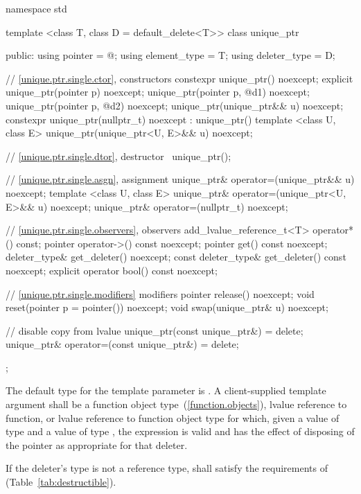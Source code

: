 %
\begin{codeblock}
namespace std {
  template <class T, class D = default_delete<T>> class unique_ptr {
  public:
    using pointer      = @\seebelow@;
    using element_type = T;
    using deleter_type = D;

    // \ref{unique.ptr.single.ctor}, constructors
    constexpr unique_ptr() noexcept;
    explicit unique_ptr(pointer p) noexcept;
    unique_ptr(pointer p, @\seebelow@ d1) noexcept;
    unique_ptr(pointer p, @\seebelow@ d2) noexcept;
    unique_ptr(unique_ptr&& u) noexcept;
    constexpr unique_ptr(nullptr_t) noexcept
      : unique_ptr() { }
    template <class U, class E>
      unique_ptr(unique_ptr<U, E>&& u) noexcept;

    // \ref{unique.ptr.single.dtor}, destructor
    ~unique_ptr();

    // \ref{unique.ptr.single.asgn}, assignment
    unique_ptr& operator=(unique_ptr&& u) noexcept;
    template <class U, class E> unique_ptr& operator=(unique_ptr<U, E>&& u) noexcept;
    unique_ptr& operator=(nullptr_t) noexcept;

    // \ref{unique.ptr.single.observers}, observers
    add_lvalue_reference_t<T> operator*() const;
    pointer operator->() const noexcept;
    pointer get() const noexcept;
    deleter_type& get_deleter() noexcept;
    const deleter_type& get_deleter() const noexcept;
    explicit operator bool() const noexcept;

    // \ref{unique.ptr.single.modifiers} modifiers
    pointer release() noexcept;
    void reset(pointer p = pointer()) noexcept;
    void swap(unique_ptr& u) noexcept;

    // disable copy from lvalue
    unique_ptr(const unique_ptr&) = delete;
    unique_ptr& operator=(const unique_ptr&) = delete;
  };
}
\end{codeblock}

\pnum
The default type for the template parameter  is
. A client-supplied template argument
 shall be a function
object type~(\ref{function.objects}), lvalue reference to function, or
lvalue reference to function object type
for which, given
a value  of type  and a value
 of type , the expression
 is valid and has the effect of disposing of the
pointer as appropriate for that deleter.

\pnum
If the deleter's type  is not a reference type,  shall satisfy
the requirements of  (Table~\ref{tab:destructible}).

